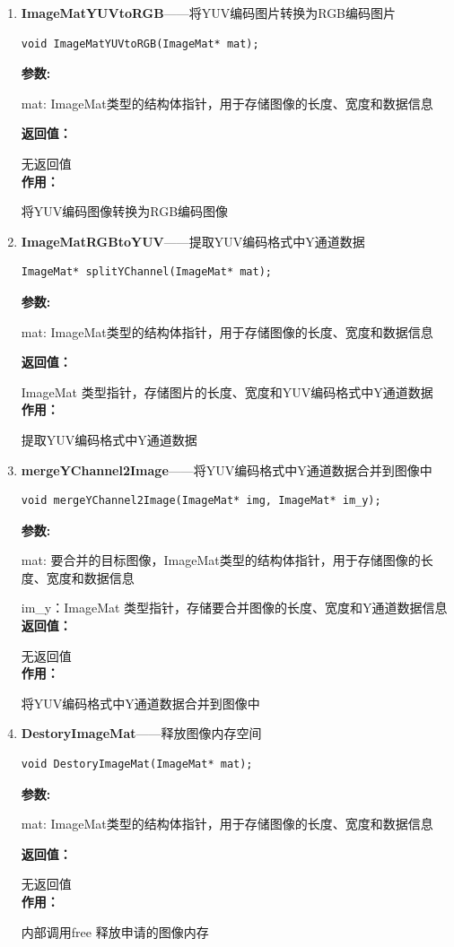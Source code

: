 \documentclass[12pt, a4paper, oneside]{ctexbook}
\begin{document}
\begin{enumerate}
			\item \textbf{ImageMatYUVtoRGB}——将YUV编码图片转换为RGB编码图片
				\begin{lstlisting}[numbers=none]
void ImageMatYUVtoRGB(ImageMat* mat);
				\end{lstlisting}
				\textbf{参数:} \par mat: ImageMat类型的结构体指针，用于存储图像的长度、宽度和数据信息\par 
				\textbf{返回值：}\par 无返回值 \\
				\textbf{作用：}\par  将YUV编码图像转换为RGB编码图像\\
			
			
			\item \textbf{ImageMatRGBtoYUV}——提取YUV编码格式中Y通道数据
				\begin{lstlisting}[numbers=none]
ImageMat* splitYChannel(ImageMat* mat);
				\end{lstlisting}
				\textbf{参数:} \par mat: ImageMat类型的结构体指针，用于存储图像的长度、宽度和数据信息\par 
				\textbf{返回值：}\par ImageMat 类型指针，存储图片的长度、宽度和YUV编码格式中Y通道数据 \\
				\textbf{作用：}\par 提取YUV编码格式中Y通道数据 \\

			\item \textbf{mergeYChannel2Image}——将YUV编码格式中Y通道数据合并到图像中
				\begin{lstlisting}[numbers=none]
void mergeYChannel2Image(ImageMat* img, ImageMat* im_y);
				\end{lstlisting}
				\textbf{参数:} \par mat: 要合并的目标图像，ImageMat类型的结构体指针，用于存储图像的长度、宽度和数据信息\par im\_y：ImageMat 类型指针，存储要合并图像的长度、宽度和Y通道数据信息 \\
				\textbf{返回值：}\par 无返回值 \\
				\textbf{作用：}\par 将YUV编码格式中Y通道数据合并到图像中 \\			

			\item \textbf{DestoryImageMat}——释放图像内存空间
				\begin{lstlisting}[numbers=none]
void DestoryImageMat(ImageMat* mat);
				\end{lstlisting}
				\textbf{参数:} \par mat: ImageMat类型的结构体指针，用于存储图像的长度、宽度和数据信息\par 
				\textbf{返回值：}\par 无返回值 \\
				\textbf{作用：}\par 内部调用free 释放申请的图像内存 \\			
							
			
		\end{enumerate}
		
\end{document}
